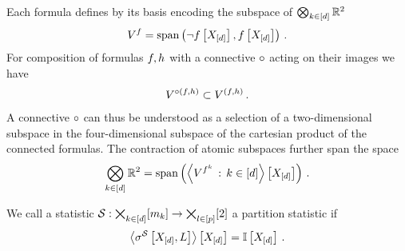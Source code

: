 
\begin{example}
    Each formula defines by its basis encoding the subspace of $\bigotimes_{k\in[d]}\mathbb{R}^2$
    \begin{align*}
        V^{f} = \mathrm{span}\left(\lnot f\left[X_{[d]}\right],f\left[X_{[d]}\right]\right) \, .
    \end{align*}
    For composition of formulas $f,h$ with a connective $\circ$ acting on their images we have %
    \begin{align*}
        V^{\circ(f,h)}
        \subset V^{(f,h)} \, .
    \end{align*}
    A connective $\circ$ can thus be understood as a selection of a two-dimensional subspace in the four-dimensional subspace of the cartesian product of the connected formulas.
    The contraction of atomic subspaces further span the space
    \begin{align*}
        \bigotimes_{k\in[d]}\mathbb{R}^2 = \mathrm{span}\left(\left\langle 
            V^{f^{k}} \, : \, k\in[d]
        \right\rangle \left[ X_{[d]} \right]\right) \, .
    \end{align*}
\end{example}


\label{sec:partitionStatistics}

\begin{definition}
    \label{def:partitionStatistic}
    We call a statistic $\mathcal{S} : \bigtimes_{k\in[d]}[m_{k}] \rightarrow \bigtimes_{l\in[p]}[2]$ a partition statistic if
    \begin{align*}
        \left\langle \sigma^{\mathcal{S}}\left[X_{[d]},L\right]\right\rangle \left[ X_{[d]} \right] = \mathbb{I}\left[X_{[d]}\right] \, .
    \end{align*}
\end{definition}


